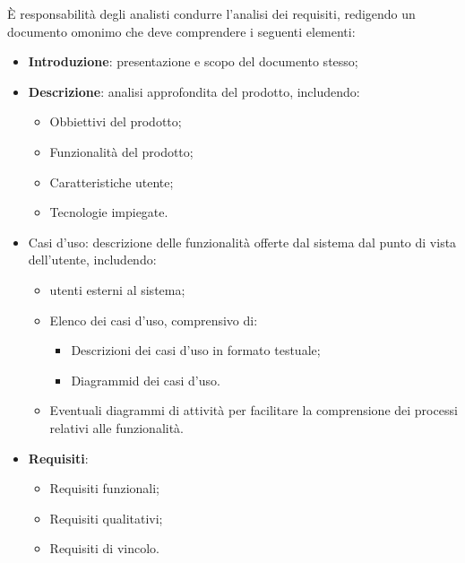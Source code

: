È responsabilità degli analisti condurre l'analisi dei requisiti, redigendo un documento omonimo che deve comprendere i seguenti elementi:
\begin{itemize}
	\item \textbf{Introduzione}: presentazione e scopo del documento stesso;
	\item \textbf{Descrizione}:  analisi approfondita del prodotto, includendo:
	      \begin{itemize}
		      \item Obbiettivi del prodotto;
		      \item Funzionalità del prodotto;
		      \item Caratteristiche utente;
		      \item Tecnologie impiegate.
	      \end{itemize}
	\item Casi d'uso: descrizione delle funzionalità offerte dal sistema dal punto di vista dell'utente, includendo:
	      \begin{itemize}
		      \item utenti esterni al sistema;
		      \item Elenco dei casi d'uso, comprensivo di:
		            \begin{itemize}
			            \item Descrizioni dei casi d'uso in formato testuale;
			            \item Diagrammid dei casi d'uso.
		            \end{itemize}
		      \item Eventuali diagrammi di attività per facilitare la comprensione dei processi relativi alle funzionalità.
	      \end{itemize}
	\item \textbf{Requisiti}:
	      \begin{itemize}
		      \item Requisiti funzionali;
		      \item Requisiti qualitativi;
		      \item Requisiti di vincolo.
	      \end{itemize}
\end{itemize}

